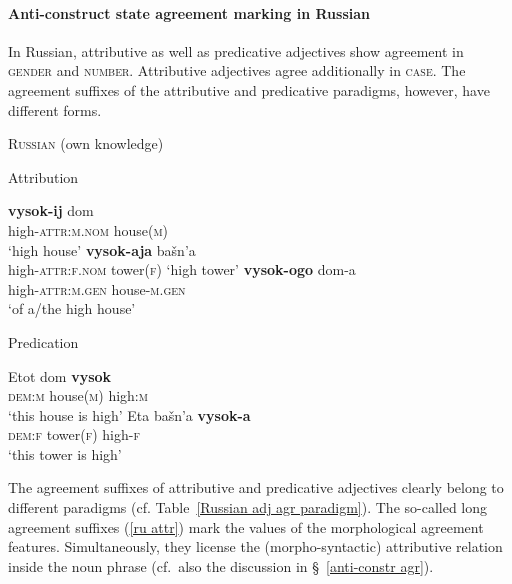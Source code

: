 \paragraph{Anti-construct state agreement marking in Russian} \label{russian synchr}
In Russian, attributive as well as predicative adjectives show agreement in \textsc{gender} and \textsc{number}. Attributive adjectives agree additionally in \textsc{case}. The agreement suffixes of the attributive and predicative paradigms, however, have different forms.
\begin{exe}
\ex \textsc{Russian} (own knowledge)\label{ru agr}
\begin{xlist}
\ex	Attribution \label{ru attr}
\begin{xlist}
\ex
\gll 	\textbf{vysok-ij} 		dom\\
	high-\textsc{attr:m.nom} house(\textsc{m})\\
\glt	 ‘high house’
\ex	\textbf{vysok-aja}	bašn'a\\
	high-\textsc{attr:f.nom} 	tower(\textsc{f})
\glt	‘high tower’
\ex	
\gll	\textbf{vysok-ogo}	dom-a\\
	high-\textsc{attr:m.gen}	house-\textsc{m.gen}\\
\glt	‘of a/the high house’
\end{xlist}
\ex	Predication
\begin{xlist}
\ex
\gll 	Etot 	dom	\textbf{vysok}\\
	\textsc{dem:m} house(\textsc{m}) 	high:\textsc{m}\\
\glt	 ‘this house is high’
\ex	
\gll	Eta 	bašn'a	\textbf{vysok-a}\\
	\textsc{dem:f} tower(\textsc{f}) 	high-\textsc{f}\\
\glt	‘this tower is high’
\end{xlist}
\end{xlist}
\end{exe}
The agreement suffixes of attributive and predicative adjectives clearly belong to different paradigms (cf. Table~\ref{Russian adj agr paradigm}). The so-called long agreement suffixes (\ref{ru attr}) mark the values of the morphological agreement features. Simultaneously, they license the (morpho-syntactic) attributive relation inside the noun phrase (cf.~also the discussion in \S~\ref{anti-constr agr}). 

